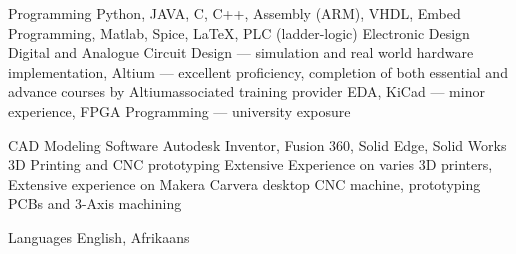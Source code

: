 

\begin{cvskills}


%

  \cvskill
    {Programming} %
    {Python, JAVA, C, C++, Assembly (ARM), VHDL, Embed Programming, Matlab, Spice, LaTeX, PLC (ladder-logic)} %
\cvskill
{Electronic Design} %
{\newline Digital and Analogue Circuit Design --- simulation and real world hardware implementation,\newline
Altium --- excellent proficiency, completion of both essential and advance courses by Altium\newline associated training provider EDA,\newline
KiCad --- minor experience,\newline
FPGA Programming --- university exposure\newline
}


\cvskill
{CAD Modeling Software} %
{Autodesk Inventor, Fusion 360, Solid Edge, Solid Works}
\cvskill
{3D Printing and CNC prototyping}
{\newline Extensive Experience on varies 3D printers,\newline
Extensive experience on Makera Carvera desktop CNC machine, prototyping PCBs and 3-Axis machining\newline} %


  \cvskill
    {Languages} %
    {English, Afrikaans} %
    


\end{cvskills}
